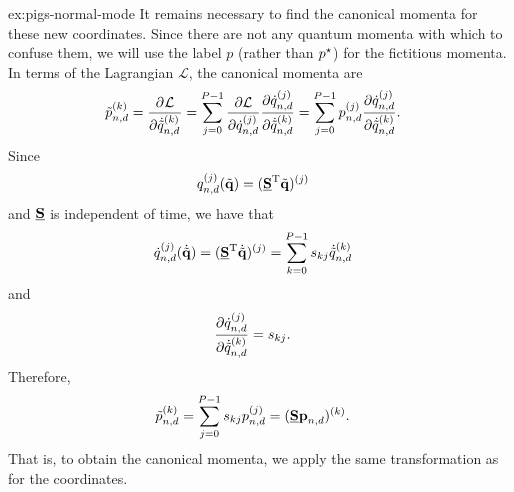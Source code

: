 \begin{DefAnswer}{ex:pigs-normal-mode}
	It remains necessary to find the canonical momenta for these new coordinates.
	Since there are not any quantum momenta with which to confuse them, we will use the label $p$ (rather than ${p}^\star$) for the fictitious momenta.
	In terms of the Lagrangian $\mathcal{L}$, the canonical momenta are~\cite[35]{evans2008statistical}
	\begin{align}
		\nm{p}_{n,d}\bead{k}
		&= \dpd{\mathcal{L}}{{\dot{\nm{q}}_{n,d}\bead{k}}}
		= \sum_{j=0}^{P-1} \frac{\partial \mathcal{L}}{\partial \dot{q}_{n,d}\bead{j}} \frac{\partial \dot{q}_{n,d}\bead{j}}{\partial \dot{\nm{q}}_{n,d}\bead{k}}
		= \sum_{j=0}^{P-1} p_{n,d}\bead{j} \frac{\partial \dot{q}_{n,d}\bead{j}}{\partial \dot{\nm{q}}_{n,d}\bead{k}}.
	\end{align}
	Since
	\begin{align}
		q_{n,d}^{(j)}(\tilde{\bm{\mathbf{q}}})
		&= (\underline{\bm{\mathbf{S}}}^\mathrm{T} \tilde{\bm{\mathbf{q}}})^{(j)}
	\end{align}
	and $\underline{\bm{\mathbf{S}}}$ is independent of time, we have that
	\begin{align}
		\dot{q}_{n,d}^{(j)}(\dot{\tilde{\bm{\mathbf{q}}}})
		&= (\underline{\bm{\mathbf{S}}}^\mathrm{T} \dot{\tilde{\bm{\mathbf{q}}}})^{(j)}
		= \sum_{k=0}^{P-1} s_{kj} \dot{\tilde{q}}_{n,d}^{(k)}
	\end{align}
	and
	\begin{align}
		\frac{\partial \dot{q}_{n,d}^{(j)}}{\partial \dot{\tilde{q}}_{n,d}^{(k)}}
		&= s_{kj}.
	\end{align}
	Therefore,
	\begin{align}
		\tilde{p}_{n,d}^{(k)}
		&= \sum_{j=0}^{P-1} s_{kj} p_{n,d}^{(j)}
		= (\underline{\bm{\mathbf{S}}} \bm{\mathbf{p}}_{n,d})^{(k)}.
	\end{align}
	That is, to obtain the canonical momenta, we apply the same transformation as for the coordinates.
\end{DefAnswer}

